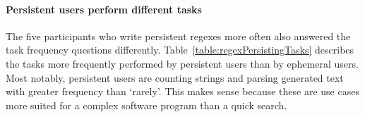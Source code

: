 \paragraph{Persistent users perform different tasks} The five participants who write persistent regexes more often also answered the task frequency questions differently.  Table~\ref{table:regexPersistingTasks} describes the tasks more frequently performed by persistent users than by ephemeral users.  Most notably, persistent users are counting strings and parsing generated text with greater frequency than `rarely'.  This makes sense because these are use cases more suited for a complex software program than a quick search.


